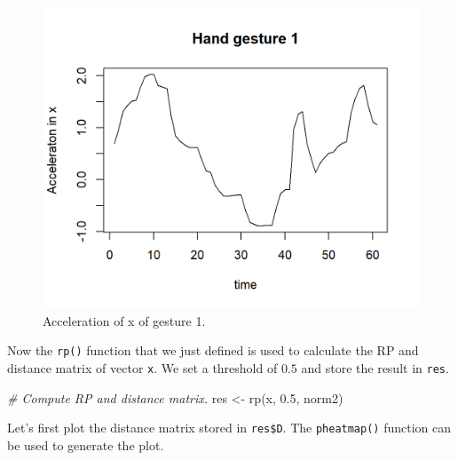 \documentclass[
  11pt,
]{krantz}
\newenvironment{Shaded}{\begin{snugshade}}{\end{snugshade}}
\newcommand{\AttributeTok}[1]{\textcolor[rgb]{0.61,0.61,0.61}{#1}}
\newcommand{\CommentTok}[1]{\textcolor[rgb]{0.37,0.37,0.37}{\textit{#1}}}
\newcommand{\ConstantTok}[1]{\textcolor[rgb]{0,0,0}{#1}}
\newcommand{\DecValTok}[1]{\textcolor[rgb]{0.06,0.06,0.06}{#1}}
\newcommand{\FloatTok}[1]{\textcolor[rgb]{0.06,0.06,0.06}{#1}}
\newcommand{\FunctionTok}[1]{\textcolor[rgb]{0,0,0}{#1}}
\newcommand{\NormalTok}[1]{#1}
\newcommand{\OtherTok}[1]{\textcolor[rgb]{0.37,0.37,0.37}{#1}}
\newcommand{\SpecialCharTok}[1]{\textcolor[rgb]{0,0,0}{#1}}
\newcommand{\StringTok}[1]{\textcolor[rgb]{0.5,0.5,0.5}{#1}}
\begin{document}
\begin{figure}

{\centering \includegraphics[width=0.9\linewidth]{images/rp_series} 

}

\caption{Acceleration of x of gesture 1.}\label{fig:gesture1X}
\end{figure}

Now the \texttt{rp()} function that we just defined is used to calculate the RP and distance matrix of vector \texttt{x}. We set a threshold of \(0.5\) and store the result in \texttt{res}.

\begin{Shaded}
\begin{Highlighting}[]
\CommentTok{\# Compute RP and distance matrix.}
\NormalTok{res }\OtherTok{\textless{}{-}} \FunctionTok{rp}\NormalTok{(x, }\FloatTok{0.5}\NormalTok{, norm2)}
\end{Highlighting}
\end{Shaded}

Let's first plot the distance matrix stored in \texttt{res\$D}. The \texttt{pheatmap()} function can be used to generate the plot.

\begin{Shaded}
\end{Shaded}
\end{document}
